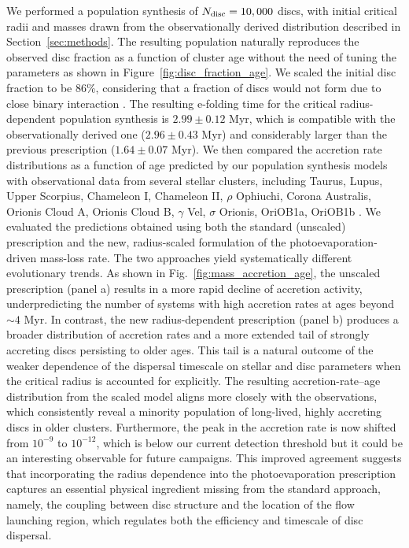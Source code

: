 \documentclass[letters,fleqn,usenatbib]{mnras}
\begin{document}
We performed a population synthesis of $N_{\rm disc} = 10,000$ discs, with initial critical radii and masses drawn from the observationally derived distribution described in Section~\ref{sec:methods}. The resulting population naturally reproduces the observed disc fraction as a function of cluster age \citep[e.g.][]{2009AIPC.1158....3M} without the need of tuning the parameters as shown in Figure~\ref{fig:disc_fraction_age}. We scaled the initial disc fraction to be 86\%, considering that a fraction of discs would not form due to close binary interaction \citep[see e.g.][]{2001ApJ...553L.153H}. The resulting e-folding time for the critical radius-dependent population synthesis is $2.99 \pm 0.12$ Myr, which is compatible with the observationally derived one ($2.96 \pm 0.43$ Myr) and considerably larger than the previous prescription ($1.64 \pm 0.07$ Myr).
We then compared the accretion rate distributions as a function of age predicted by our population synthesis models with observational data from several stellar clusters, including Taurus, Lupus, Upper Scorpius, Chameleon I, Chameleon II, $\rho$ Ophiuchi, Corona Australis, Orionis Cloud A, Orionis Cloud B, $\gamma$ Vel, $\sigma$ Orionis, OriOB1a, OriOB1b \citep{2023ASPC..534..539M, 2022yCat..51630074T}. We evaluated the predictions obtained using both the standard (unscaled) prescription and the new, radius-scaled formulation of the photoevaporation-driven mass-loss rate.
The two approaches yield systematically different evolutionary trends. As shown in Fig.~\ref{fig:mass_accretion_age}, the unscaled prescription (panel a) results in a more rapid decline of accretion activity, underpredicting the number of systems with high accretion rates at ages beyond $\sim 4$ Myr. In contrast, the new radius-dependent prescription (panel b) produces a broader distribution of accretion rates and a more extended tail of strongly accreting discs persisting to older ages. This tail is a natural outcome of the weaker dependence of the dispersal timescale on stellar and disc parameters when the critical radius is accounted for explicitly.
The resulting accretion-rate–age distribution from the scaled model aligns more closely with the observations, which consistently reveal a minority population of long-lived, highly accreting discs in older clusters. Furthermore, the peak in the accretion rate is now shifted from $10^{-9}$ to $10^{-12}$, which is below our current detection threshold \citep{2023ApJ...944...90T} but it could be an interesting observable for future campaigns. This improved agreement suggests that incorporating the radius dependence into the photoevaporation prescription captures an essential physical ingredient missing from the standard approach, namely, the coupling between disc structure and the location of the flow launching region, which regulates both the efficiency and timescale of disc dispersal.
\end{document}
